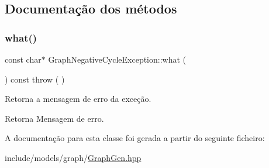 \subsection{Documentação dos métodos}
\mbox{\label{classGraphNegativeCycleException_ae973328a57ec48ac66298365bfe7ded4}} 
\subsubsection{\texorpdfstring{what()}{what()}}
{\footnotesize\ttfamily const char$\ast$ Graph\+Negative\+Cycle\+Exception\+::what (\begin{DoxyParamCaption}{ }\end{DoxyParamCaption}) const throw ( ) \hspace{0.3cm}{\ttfamily [inline]}}

Retorna a mensagem de erro da exceção. \begin{DoxyReturn}{Retorna}
Mensagem de erro. 
\end{DoxyReturn}


A documentação para esta classe foi gerada a partir do seguinte ficheiro\+:\begin{DoxyCompactItemize}
\item 
include/models/graph/\mbox{\hyperlink{GraphGen_8hpp}{Graph\+Gen.\+hpp}}\end{DoxyCompactItemize}
